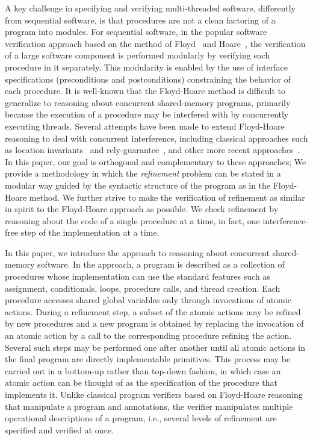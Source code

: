 A key challenge in specifying and verifying multi-threaded software, differently from sequential software, is that procedures are not a clean factoring of a program into modules. 
For sequential software, in the popular software verification approach based on the method of Floyd~\cite{Floyd67} and Hoare~\cite{Hoare69}, the verification of a large software component is performed modularly by verifying each procedure in it separately.
This modularity is enabled by the use of interface specifications (preconditions and postconditions) constraining the behavior of each procedure.
It is well-known that the Floyd-Hoare method is difficult to generalize to reasoning about concurrent shared-memory programs,
primarily because the execution of a procedure may be interfered with by concurrently executing threads.
Several attempts have been made to extend Floyd-Hoare reasoning to deal with concurrent interference, 
including classical approaches such as location invariants~\cite{Ashcroft75,OwickiG76} and rely-guarantee~\cite{Jones83},
and other more recent approaches~\cite{OHearn07,RGSep}. 
In this paper, our goal is orthogonal and complementary to these approaches; We provide a methodology in which the {\em refinement} problem can be stated in a modular way guided by the syntactic structure of the program as in the Floyd-Hoare method. 
We further strive to make the verification of refinement as similar in spirit to the Floyd-Hoare approach as possible. 
We check refinement by reasoning about the code of a single procedure at a time, in fact, one interference-free step of the implementation at a time. 

In this paper, we introduce the \civl approach to reasoning about concurrent shared-memory software.
In the \civl approach, a program is described as a collection of procedures whose implementation 
can use the standard features such as assignment, conditionals, loops, procedure calls, and thread creation. 
Each procedure accesses shared global variables only through invocations of atomic actions.
During a refinement step, a subset of the atomic actions may be refined by new procedures and a new program is 
obtained by replacing the invocation of an atomic action by a call to the corresponding procedure refining the action.
Several such steps may be performed one after another until all atomic actions in the final program are directly implementable primitives.
This process may be carried out in a bottom-up rather than top-down fashion, in which case an atomic action 
can be thought of as the specification of the procedure that implements it.
Unlike classical program verifiers based on Floyd-Hoare reasoning that manipulate a program and annotations, 
the \civl verifier manipulates multiple operational descriptions of a program, i.e., several levels of refinement are specified and verified at once. 

